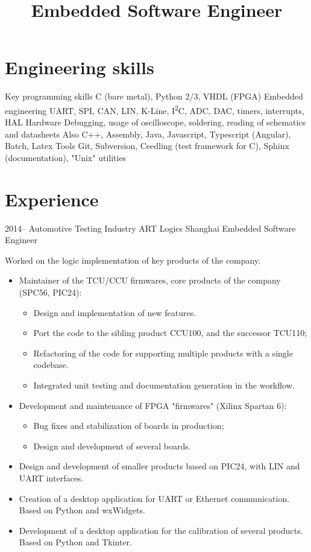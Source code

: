 \documentclass[11pt,a4paper,sans]{moderncv}        %
\title{Embedded Software Engineer}                               %
\begin{document}
\makecvtitle

\section{Engineering skills}
\cvitem
  {Key programming skills}
  {C (bare metal), Python 2/3, VHDL (FPGA)}
\cvitem
  {Embedded engineering}
  {UART, SPI, CAN, LIN, K-Line, I\textsuperscript{2}C, ADC, DAC, timers, interrupts, HAL}
\cvitem
  {Hardware}
  {Debugging, usage of oscilloscope, soldering, reading of schematics and datasheets}
\cvitem
  {Also}
  {C++, Assembly, Java, Javascript, Typescript (Angular), Batch, Latex}
\cvitem
  {Tools}
  {Git, Subversion, Ceedling (test framework for C), Sphinx (documentation), "Unix" utilities}

\section{Experience}
\cventry
  {2014--\the\year}
  {Automotive Testing Industry}
  {ART Logics}
  {Shanghai}
  {Embedded Software Engineer}
  {
    Worked on the logic implementation of key products of the company.
    \begin{itemize}%
    \item Maintainer of the TCU/CCU firmwares, core products of the company (SPC56, PIC24):
      \begin{itemize}%
      \item Design and implementation of new features.
      \item Port the code to the sibling product CCU100, and the successor TCU110;
      \item Refactoring of the code for supporting multiple products with a single codebase.
      \item Integrated unit testing and documentation generation in the workflow.
      \end{itemize}
    \item Development and maintenance of FPGA "firmwares" (Xilinx Spartan 6):
      \begin{itemize}%
      \item Bug fixes and stabilization of boards in production;
      \item Design and development of several boards.
      \end{itemize}
    \item Design and development of smaller products based on PIC24, with LIN and UART interfaces.
    \item Creation of a desktop application for UART or Ethernet communication. Based on Python and wxWidgets.
    \item Development of a desktop application for the calibration of several products. Based on Python and Tkinter.
    \end{itemize}
  }
\end{document}
